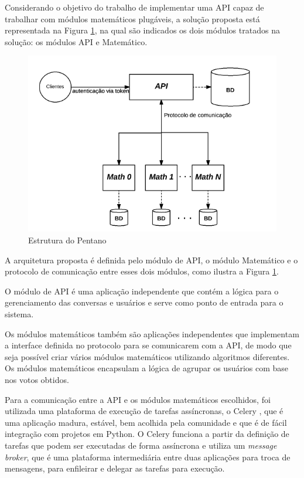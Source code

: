     Considerando o objetivo do trabalho de implementar uma API capaz de trabalhar com 
    módulos matemáticos plugáveis, a solução proposta está representada na Figura \ref{fig:pentano}, 
    na qual são indicados os dois módulos tratados na solução: os módulos API e Matemático.
    
    \begin{figure}[h!]
    \centering
    \includegraphics[scale=0.7]{figuras/esquema_pentano.png}
    \caption{Estrutura do Pentano}
    \label{fig:pentano}
    \end{figure}
    
    A arquitetura proposta é definida pelo módulo de API, o módulo Matemático
    e o protocolo de comunicação entre esses dois módulos, como ilustra a Figura \ref{fig:pentano}.
    
    O módulo de API é uma aplicação independente que contém a lógica para o gerenciamento das conversas e usuários e
    serve como ponto de entrada para o sistema.
    
    Os módulos matemáticos também são aplicações independentes que implementam a interface definida no protocolo
    para se comunicarem com a API, de modo que seja possível criar vários módulos matemáticos utilizando algoritmos diferentes.
    Os módulos matemáticos encapsulam a lógica de agrupar os usuários com base nos votos obtidos.
    
    Para a comunicação entre a API e os módulos matemáticos escolhidos, foi utilizada
    uma plataforma de execução de tarefas assíncronas, o Celery \footnotemark, que é uma aplicação
    madura, estável, bem acolhida pela comunidade e que é de fácil integração com projetos em Python.
    O Celery funciona a partir da definição de tarefas que podem ser executadas de forma assíncrona
    e utiliza um \textit{message broker}, que é uma plataforma intermediária
    entre duas aplicações para troca de mensagens, para enfileirar e delegar as tarefas para execução.
    
